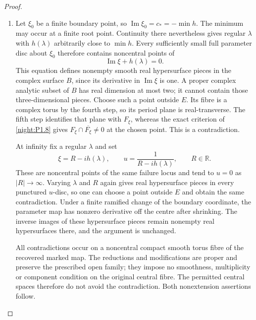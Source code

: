 \begin{proof}
\begin{enumerate}[label=\arabic*.]
\item Let $\xi_0$ be a finite boundary point, so
$\operatorname{Im}\xi_0=c_*=-\min h$.
The minimum may occur at a finite root point.  Continuity
there nevertheless gives regular $\lambda$ with $h(\lambda)$
arbitrarily close to $\min h$.  Every sufficiently small full
parameter disc about $\xi_0$ therefore contains noncentral
points of
\[
 \operatorname{Im}\xi+h(\lambda)=0.
\]
This equation defines nonempty smooth real hypersurface
pieces in the complex surface $B$, since its derivative in
$\operatorname{Im}\xi$ is one.  A proper complex analytic
subset of $B$ has real dimension at most two; it cannot
contain those three-dimensional pieces.  Choose such a
point outside $E$.  Its fibre is a complex torus by the fourth
step, so its period plane is real-transverse.  The fifth step
identifies that plane with $F_\xi$, whereas the exact criterion
of \cref{night:P1.8} gives
$F_\xi\cap\overline{F_\xi}\ne0$ at the chosen point.
This is a contradiction.

At infinity fix a regular $\lambda$ and set
\[
 \xi=R-i h(\lambda),\qquad
 u=\frac1{R-i h(\lambda)},\qquad R\in\mathbb R.
\]
These are noncentral points of the same failure locus and
tend to $u=0$ as $|R|\to\infty$.  Varying $\lambda$ and $R$
again gives real hypersurface pieces in every punctured
$u$-disc, so one can choose a point outside $E$ and obtain the
same contradiction.  Under a finite ramified change of the
boundary coordinate, the parameter map has nonzero derivative
off the centre after shrinking.  The inverse images of these
hypersurface pieces remain nonempty real hypersurfaces there,
and the argument is unchanged.

All contradictions occur on a noncentral compact smooth
torus fibre of the recovered marked map.  The reductions and
modifications are proper and preserve the prescribed open
family; they impose no smoothness, multiplicity or component
condition on the original central fibre.  The permitted
central spaces therefore do not avoid the contradiction.
Both nonextension assertions follow.
\end{enumerate}
\end{proof}




